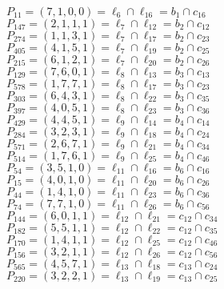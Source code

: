 \documentclass{article}
\begin{document}
{\begin{multicols}{2}
$P_{11} = ( 7, 1, 0, 0 ) = \ell_{6} \cap \ell_{16}  = b_{1} \cap c_{16}$\\
$P_{147} = ( 2, 1, 1, 1 ) = \ell_{7} \cap \ell_{12}  = b_{2} \cap c_{12}$\\
$P_{274} = ( 1, 1, 3, 1 ) = \ell_{7} \cap \ell_{17}  = b_{2} \cap c_{23}$\\
$P_{405} = ( 4, 1, 5, 1 ) = \ell_{7} \cap \ell_{19}  = b_{2} \cap c_{25}$\\
$P_{215} = ( 6, 1, 2, 1 ) = \ell_{7} \cap \ell_{20}  = b_{2} \cap c_{26}$\\
$P_{129} = ( 7, 6, 0, 1 ) = \ell_{8} \cap \ell_{13}  = b_{3} \cap c_{13}$\\
$P_{578} = ( 1, 7, 7, 1 ) = \ell_{8} \cap \ell_{17}  = b_{3} \cap c_{23}$\\
$P_{303} = ( 6, 4, 3, 1 ) = \ell_{8} \cap \ell_{22}  = b_{3} \cap c_{35}$\\
$P_{397} = ( 4, 0, 5, 1 ) = \ell_{8} \cap \ell_{23}  = b_{3} \cap c_{36}$\\
$P_{429} = ( 4, 4, 5, 1 ) = \ell_{9} \cap \ell_{14}  = b_{4} \cap c_{14}$\\
$P_{284} = ( 3, 2, 3, 1 ) = \ell_{9} \cap \ell_{18}  = b_{4} \cap c_{24}$\\
$P_{571} = ( 2, 6, 7, 1 ) = \ell_{9} \cap \ell_{21}  = b_{4} \cap c_{34}$\\
$P_{514} = ( 1, 7, 6, 1 ) = \ell_{9} \cap \ell_{25}  = b_{4} \cap c_{46}$\\
$P_{54} = ( 3, 5, 1, 0 ) = \ell_{11} \cap \ell_{16}  = b_{6} \cap c_{16}$\\
$P_{15} = ( 4, 0, 1, 0 ) = \ell_{11} \cap \ell_{20}  = b_{6} \cap c_{26}$\\
$P_{44} = ( 1, 4, 1, 0 ) = \ell_{11} \cap \ell_{23}  = b_{6} \cap c_{36}$\\
$P_{74} = ( 7, 7, 1, 0 ) = \ell_{11} \cap \ell_{26}  = b_{6} \cap c_{56}$\\
$P_{144} = ( 6, 0, 1, 1 ) = \ell_{12} \cap \ell_{21}  = c_{12} \cap c_{34}$\\
$P_{182} = ( 5, 5, 1, 1 ) = \ell_{12} \cap \ell_{22}  = c_{12} \cap c_{35}$\\
$P_{170} = ( 1, 4, 1, 1 ) = \ell_{12} \cap \ell_{25}  = c_{12} \cap c_{46}$\\
$P_{156} = ( 3, 2, 1, 1 ) = \ell_{12} \cap \ell_{26}  = c_{12} \cap c_{56}$\\
$P_{565} = ( 4, 5, 7, 1 ) = \ell_{13} \cap \ell_{18}  = c_{13} \cap c_{24}$\\
$P_{220} = ( 3, 2, 2, 1 ) = \ell_{13} \cap \ell_{19}  = c_{13} \cap c_{25}$\\

\end{multicols}}
\end{document}
